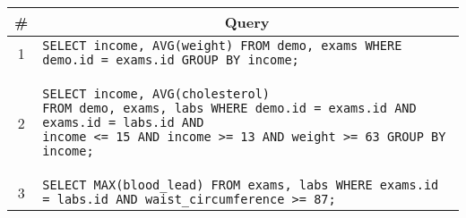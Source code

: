 \begin{tabular}{cl}
\toprule
\# & \multicolumn{1}{c}{Query} \\
\midrule
1 & \verb|SELECT income, AVG(weight) FROM demo, exams WHERE demo.id = exams.id GROUP BY income;| {queryno} \label{q1} \\
2 & 
\begin{minipage}{6in}
\begin{lstlisting}[breaklines]
SELECT income, AVG(cholesterol) 
FROM demo, exams, labs WHERE demo.id = exams.id AND exams.id = labs.id AND
income <= 15 AND income >= 13 AND weight >= 63 GROUP BY income;
\end{lstlisting}
\end{minipage}
{queryno} \label{q2} \\
3 & \verb|SELECT MAX(blood_lead) FROM exams, labs WHERE exams.id = labs.id AND waist_circumference >= 87;| {queryno} \label{q3} \\
\bottomrule
\end{tabular}
